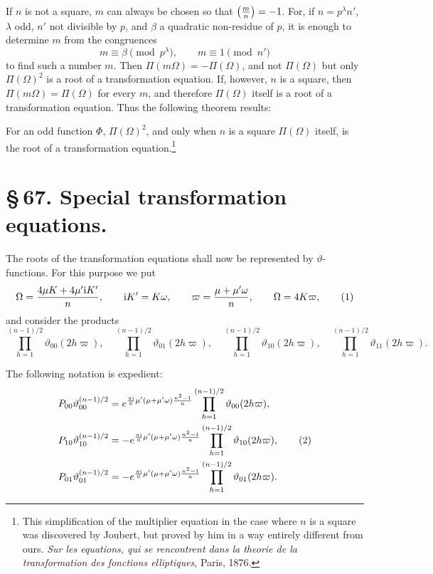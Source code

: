 \documentclass[11pt]{article}
\providecommand{\ii}{\mathrm{i}}
\begin{document}
If $n$ is not a square, $m$ can always be chosen so that $\left({m\over n}\right)=-1$. For, if $n=p^\lambda n'$, $\lambda$ odd, $n'$ not divisible by $p$, and $\beta$ a quadratic non-residue of $p$, it is enough to determine $m$ from the congruences
\[
m\equiv\beta\pmod {p^\lambda},\qquad m\equiv1\pmod {n'}
\]
to find such a number $m$. Then $\Pi(m\Omega)=-\Pi(\Omega)$, and not $\Pi(\Omega)$ but only $\Pi(\Omega)^2$ is a root of a transformation equation. If, however, $n$ is a square, then $\Pi(m\Omega)=\Pi(\Omega)$ for every $m$, and therefore $\Pi(\Omega)$ itself is a root of a transformation equation. Thus the following theorem results:

For an odd function $\Phi$, $\Pi(\Omega)^2$, and only when $n$ is a square $\Pi(\Omega)$ itself, is the root of a transformation equation.\footnote{This simplification of the multiplier equation in the case where $n$ is a square was discovered by Joubert, but proved by him in a way entirely different from ours. \emph{Sur les equations, qui se rencontrent dans la theorie de la transformation des fonctions elliptiques}, Paris, 1876.}

\section*{\S\,67. Special transformation equations.}

The roots of the transformation equations shall now be represented by $\vartheta$-functions. For this purpose we put
\begin{equation}
\Omega={4\mu K+4\mu'\ii K'\over n},\qquad \ii K'=K\omega,
\qquad
\varpi={\mu+\mu'\omega\over n},\qquad \Omega=4K\varpi,
\tag{1}
\end{equation}
and consider the products
\[
\prod_{h=1}^{(n-1)/2}\vartheta_{00}(2h\varpi),\quad
\prod_{h=1}^{(n-1)/2}\vartheta_{01}(2h\varpi),\quad
\prod_{h=1}^{(n-1)/2}\vartheta_{10}(2h\varpi),\quad
\prod_{h=1}^{(n-1)/2}\vartheta_{11}(2h\varpi).
\]

The following notation is expedient:
\begin{align}
P_{00}\vartheta_{00}^{(n-1)/2}
&=e^{{\pi\ii\over6}\mu'(\mu+\mu'\omega){n^2-1\over n}}
  \prod_{h=1}^{(n-1)/2}\vartheta_{00}(2h\varpi),\notag\\
P_{10}\vartheta_{10}^{(n-1)/2}
&=-e^{{\pi\ii\over6}\mu'(\mu+\mu'\omega){n^2-1\over n}}
  \prod_{h=1}^{(n-1)/2}\vartheta_{10}(2h\varpi),\tag{2}\\
P_{01}\vartheta_{01}^{(n-1)/2}
&=-e^{{\pi\ii\over6}\mu'(\mu+\mu'\omega){n^2-1\over n}}
  \prod_{h=1}^{(n-1)/2}\vartheta_{01}(2h\varpi).\notag
\end{align}
\end{document}
